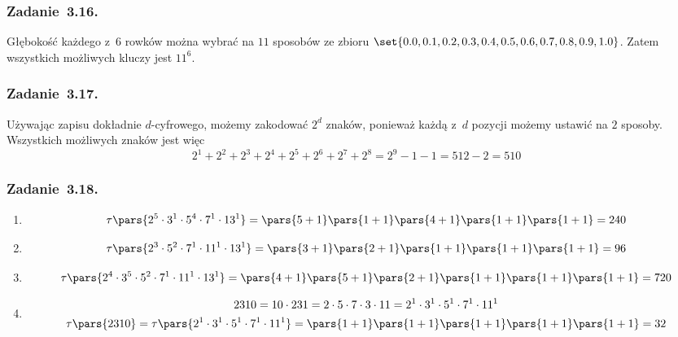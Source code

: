 \subsubsection*{Zadanie~3.16.}
Głębokość każdego z~\(6\) rowków można wybrać na \(11\) sposobów ze zbioru \(\set{0.0, 0.1, 0.2, 0.3, 0.4, 0.5, 0.6, 0.7, 0.8, 0.9, 1.0}\). Zatem wszystkich możliwych kluczy jest \(11^6\).
\subsubsection*{Zadanie~3.17.}
Używając zapisu dokładnie \(d\)-cyfrowego, możemy zakodować \(2^d\) znaków, ponieważ każdą z~\(d\) pozycji możemy ustawić na \(2\) sposoby. Wszystkich możliwych znaków jest więc
\begin{equation*}
    2^1 + 2^2 + 2^3 + 2^4 + 2^5 + 2^6 + 2^7 + 2^8
        = 2^9 - 1 - 1
        = 512 - 2
        = 510
\end{equation*}
\subsubsection{Zadanie~3.18.}
\begin{enumerate}[label={\alph*)}]
    \item
        \begin{equation*}
            \tau\pars{2^5 \cdot 3^1 \cdot 5^4 \cdot 7^1 \cdot 13^1}
                = \pars{5 + 1}\pars{1 + 1}\pars{4 + 1}\pars{1 + 1}\pars{1 + 1}
                = 240
        \end{equation*}
    \item
        \begin{equation*}
            \tau\pars{2^3 \cdot 5^2 \cdot 7^1 \cdot 11^1 \cdot 13^1}
                = \pars{3 + 1}\pars{2 + 1}\pars{1 + 1}\pars{1 + 1}\pars{1 + 1}
                = 96
        \end{equation*}
    \item
        \begin{equation*}
            \tau\pars{2^4 \cdot 3^5 \cdot 5^2 \cdot 7^1 \cdot 11^1 \cdot 13^1}
                = \pars{4 + 1}\pars{5 + 1}\pars{2 + 1}\pars{1 + 1}\pars{1 + 1}\pars{1 + 1}
                = 720
        \end{equation*}
    \item
        \begin{gather*}
            2310 = 10 \cdot 231 = 2 \cdot 5 \cdot 7 \cdot 3 \cdot 11 = 2^1 \cdot 3^1 \cdot 5^1 \cdot 7^1 \cdot 11^1\\
            \tau\pars{2310}
                = \tau\pars{2^1 \cdot 3^1 \cdot 5^1 \cdot 7^1 \cdot 11^1}
                = \pars{1 + 1}\pars{1 + 1}\pars{1 + 1}\pars{1 + 1}\pars{1 + 1}
                = 32
        \end{gather*}
\end{enumerate}

